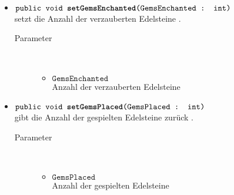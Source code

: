 \begin{description}
\begin{itemize}
					\item $\texttt{public  void \textbf{setGemsEnchanted}(GemsEnchanted : int)}$ \\ setzt die Anzahl der verzauberten Edelsteine  .
				\begin{description}
				\item[Parameter] \hfill \\
					\vspace{-.8cm}
					\begin{itemize}
						\item $\texttt{GemsEnchanted }$ \\Anzahl der verzauberten Edelsteine
					\end{itemize}	
					\end{description}
					\item $\texttt{public  void \textbf{setGemsPlaced}(GemsPlaced : int)}$ \\ gibt die Anzahl der gespielten Edelsteine zurück .
				\begin{description}
				\item[Parameter] \hfill \\
					\vspace{-.8cm}
					\begin{itemize}
						\item $\texttt{GemsPlaced }$ \\Anzahl der gespielten Edelsteine
					\end{itemize}	
					\end{description}
			\end{itemize}
		\end{description}
